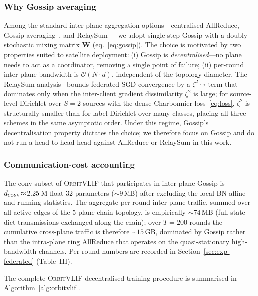 \documentclass[conference]{IEEEtran}
\newcommand{\OrbitVLIF}{\textsc{OrbitVLIF}}
\begin{document}
\subsubsection*{Why Gossip averaging}
Among the standard inter-plane aggregation
options---centralised AllReduce, Gossip
averaging~\cite{ref:gossip1,ref:gossip2}, and RelaySum~\cite{ref:relaysum}---we
adopt single-step Gossip with a doubly-stochastic mixing matrix
$\mathbf{W}$ (eq.~\ref{eq:gossip}). The choice is motivated by two
properties suited to satellite deployment: (i) Gossip is
\emph{decentralised}---no plane needs to act as a coordinator,
removing a single point of failure; (ii) per-round inter-plane
bandwidth is $\mathcal{O}(N\!\cdot\!d)$, independent of the
topology diameter. The RelaySum
analysis~\cite{ref:relaysum} bounds federated SGD convergence by a
$\zeta^2\!\cdot\!\tau$ term that dominates only when the
inter-client gradient dissimilarity $\zeta^2$ is large; for
source-level Dirichlet over $S\!=\!2$ sources with the dense
Charbonnier loss~\eqref{eq:loss}, $\zeta^2$ is structurally smaller
than for label-Dirichlet over many classes, placing all three
schemes in the same asymptotic order. Under this regime, Gossip's
decentralisation property dictates the choice; we therefore focus
on Gossip and do not run a head-to-head head against AllReduce or
RelaySum in this work.

\subsubsection*{Communication-cost accounting}
The conv subset of \OrbitVLIF{} that participates in inter-plane
Gossip is $d_\textsc{conv}\!\approx\!2.25$\,M float-32 parameters
($\sim 9$\,MB) after excluding the local BN affine and running
statistics. The aggregate per-round inter-plane traffic, summed
over all active edges of the $5$-plane chain topology, is
empirically $\sim 74$\,MB (full state-dict transmissions exchanged
along the chain); over $T\!=\!200$ rounds the cumulative cross-plane
traffic is therefore $\sim 15$\,GB, dominated by Gossip rather
than the intra-plane ring AllReduce that operates on the
quasi-stationary high-bandwidth channels. Per-round numbers are
recorded in Section~\ref{sec:exp-federated} (Table~III).

The complete \OrbitVLIF{} decentralised training procedure is
summarised in Algorithm~\ref{alg:orbitvlif}.
\end{document}
